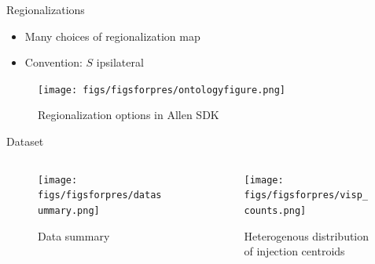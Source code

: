 \documentclass{beamer}
\begin{document}
\begin{frame}{Regionalizations}
\begin{itemize}
    \item Many choices of regionalization map
    \item Convention: $S$ ipsilateral
\end{itemize}
\begin{figure}
    \centering
    \texttt{[image: figs/figsforpres/ontologyfigure.png]}
    \caption{Regionalization options in Allen SDK}
    \label{fig:my_label}
\end{figure}
\end{frame}

\begin{frame}{Dataset}
\begin{columns}
\begin{column}{.5\textwidth}
\begin{figure}
    \centering
    \texttt{[image: figs/figsforpres/datasummary.png]}
    \caption{Data summary}
    \label{fig:my_label}
\end{figure}
\end{column}
\begin{column}{.5\textwidth}
\begin{figure}
    \centering
    \texttt{[image: figs/figsforpres/visp\_counts.png]}
    \caption{Heterogenous distribution of injection centroids}
    \label{fig:my_label}
\end{figure}
\end{column}
\end{columns}
\end{frame}
\end{document}
